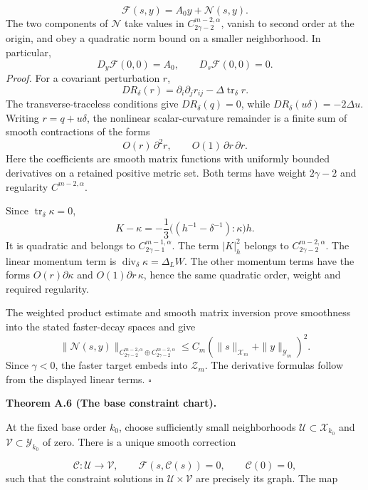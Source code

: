 \documentclass[
  english,
  11pt,
  reqno]{amsart}
\makeatletter
\newcommand{\pandocstatementheading}[1]{%
  \par\addpenalty{\@beginparpenalty}%
  \addvspace{.5\baselineskip plus .2\baselineskip minus .2\baselineskip}%
  {\normalfont\bfseries #1\par}%
  \nobreak\@afterindenttrue\@afterheading
}
\makeatother
\begin{document}
\label{eq:online-chart-constraint-split} \[
\mathcal F(s,y)=A_0y+\mathcal N(s,y).
\] The two components of \(\mathcal N\) take values in
\(C^{m-2,\alpha}_{2\gamma-2}\), vanish to second order at the origin,
and obey a quadratic norm bound on a smaller neighborhood. In
particular, \[
D_y\mathcal F(0,0)=A_0,\qquad
D_s\mathcal F(0,0)=0.
\] \emph{Proof.} For a covariant perturbation \(r\), \[
DR_\delta(r)
=\partial_i\partial_jr_{ij}
-\Delta\operatorname{tr}_\delta r.
\] The transverse-traceless conditions give \(DR_\delta(q)=0\), while
\(DR_\delta(u\delta)=-2\Delta u\). Writing \(r=q+u\delta\), the
nonlinear scalar-curvature remainder is a finite sum of smooth
contractions of the forms \[
O(r)\,\partial^2r,\qquad
O(1)\,\partial r\,\partial r.
\] Here the coefficients are smooth matrix functions with uniformly
bounded derivatives on a retained positive metric set. Both terms have
weight \(2\gamma-2\) and regularity \(C^{m-2,\alpha}\).

Since \(\operatorname{tr}_\delta\kappa=0\), \[
K-\kappa
=-\frac13\bigl((h^{-1}-\delta^{-1}):\kappa\bigr)h.
\] It is quadratic and belongs to \(C^{m-1,\alpha}_{2\gamma-1}\). The
term \(|K|_h^2\) belongs to \(C^{m-2,\alpha}_{2\gamma-2}\). The linear
momentum term is \(\operatorname{div}_\delta\kappa=\Delta_LW\). The
other momentum terms have the forms \(O(r)\partial\kappa\) and
\(O(1)\partial r\,\kappa\), hence the same quadratic order, weight and
required regularity.

The weighted product estimate and smooth matrix inversion prove
smoothness into the stated faster-decay spaces and give \[
\|\mathcal N(s,y)\|_{C^{m-2,\alpha}_{2\gamma-2}
\oplus C^{m-2,\alpha}_{2\gamma-2}}
\le C_m(\|s\|_{\mathcal X_m}+\|y\|_{\mathcal Y_m})^2.
\] Since \(\gamma<0\), the faster target embeds into \(\mathcal Z_m\).
The derivative formulas follow from the displayed linear terms.
\hfill\(\square\)

\pandocstatementheading{\leavevmode{}\label{thm:online-chart-base-constraint-bijection}Theorem A.6 (The base constraint chart).}

At the fixed base order \(k_0\), choose sufficiently small neighborhoods
\(\mathcal U\subset\mathcal X_{k_0}\) and
\(\mathcal V\subset\mathcal Y_{k_0}\) of zero. There is a unique smooth
correction

\label{eq:online-chart-selected-correction} \[
\mathcal C:\mathcal U\longrightarrow\mathcal V,\qquad
\mathcal F(s,\mathcal C(s))=0,\qquad
\mathcal C(0)=0,
\] such that the constraint solutions in \(\mathcal U\times\mathcal V\)
are precisely its graph. The map
\end{document}
